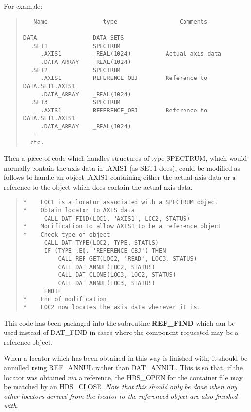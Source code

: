 \documentclass[twoside,11pt]{article}
\begin{document}
For example:
\begin{quote}
\begin{verbatim}
   Name                type                  Comments

DATA                DATA_SETS
  .SET1             SPECTRUM
     .AXIS1         _REAL(1024)          Actual axis data
     .DATA_ARRAY    _REAL(1024)
  .SET2             SPECTRUM
     .AXIS1         REFERENCE_OBJ        Reference to DATA.SET1.AXIS1
     .DATA_ARRAY    _REAL(1024)
  .SET3             SPECTRUM
     .AXIS1         REFERENCE_OBJ        Reference to DATA.SET1.AXIS1
     .DATA_ARRAY    _REAL(1024)  
   -
  etc.
\end{verbatim}
\end{quote}

Then a piece of code which handles structures of type SPECTRUM, which
would normally contain the axis data in .AXIS1 (as SET1 does), could be
modified as follows to handle an object .AXIS1 containing either the
actual axis data or a reference to the object which does contain the
actual axis data.

\begin{quote}
\begin{verbatim}
*    LOC1 is a locator associated with a SPECTRUM object
*    Obtain locator to AXIS data
      CALL DAT_FIND(LOC1, 'AXIS1', LOC2, STATUS)
*    Modification to allow AXIS1 to be a reference object
*    Check type of object
      CALL DAT_TYPE(LOC2, TYPE, STATUS)
      IF (TYPE .EQ. 'REFERENCE_OBJ') THEN
          CALL REF_GET(LOC2, 'READ', LOC3, STATUS)
          CALL DAT_ANNUL(LOC2, STATUS)
          CALL DAT_CLONE(LOC3, LOC2, STATUS)
          CALL DAT_ANNUL(LOC3, STATUS)
      ENDIF
*    End of modification
*    LOC2 now locates the axis data wherever it is.
\end{verbatim}
\end{quote}

This code has been packaged into the subroutine \textbf{REF\_FIND} which
can be used instead of DAT\_FIND in cases where the component requested
may be a reference object.

When a locator which has been obtained in this way is finished with, it
should be annulled using REF\_ANNUL rather than DAT\_ANNUL.  This is so
that, if the locator was obtained \emph{via} a reference, the HDS\_OPEN
for the container file may be matched by an HDS\_CLOSE\@.  \emph{Note
that this should only be done when any other locators derived from the
locator to the referenced object are also finished with.}
\end{document}

